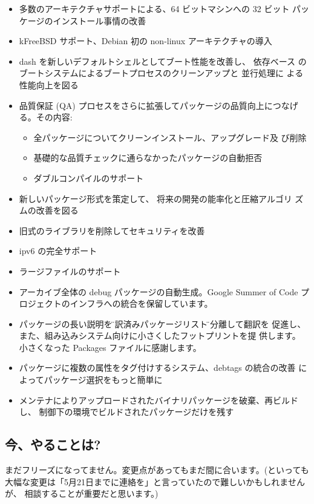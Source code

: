 \documentclass[mingoth,a4paper]{jsarticle}
\begin{document}
\begin{itemize}
 \item 多数のアーキテクチャサポートによる、64 ビットマシンへの 32 ビット
       パッケージのインストール事情の改善
 \item kFreeBSD サポート、Debian 初の non-linux アーキテクチャの導入
 \item dash を新しいデフォルトシェルとしてブート性能を改善し、 依存ベース
       のブートシステムによるブートプロセスのクリーンアップと 並行処理に
       よる性能向上を図る
 \item 品質保証 (QA) プロセスをさらに拡張してパッケージの品質向上につなげ
       る。その内容:
        \begin{itemize}
         \item 全パッケージについてクリーンインストール、アップグレード及
               び削除
         \item 基礎的な品質チェックに通らなかったパッケージの自動拒否
         \item ダブルコンパイルのサポート
        \end{itemize}
 \item 新しいパッケージ形式を策定して、 将来の開発の能率化と圧縮アルゴリ
       ズムの改善を図る
 \item 旧式のライブラリを削除してセキュリティを改善
 \item ipv6 の完全サポート
 \item ラージファイルのサポート
 \item アーカイブ全体の debug パッケージの自動生成。Google Summer of
       Code プロジェクトのインフラへの統合を保留しています。
 \item パッケージの長い説明を\"翻訳済みパッケージリスト\"に分離して翻訳を
       促進し、 また、組み込みシステム向けに小さくしたフットプリントを提
       供します。 小さくなった Packages ファイルに感謝します。
 \item パッケージに複数の属性をタグ付けするシステム、debtags の統合の改善
       によってパッケージ選択をもっと簡単に
 \item メンテナによりアップロードされたバイナリパッケージを破棄、再ビルド
       し、 制御下の環境でビルドされたパッケージだけを残す
\end{itemize}

\subsection{今、やることは?}

まだフリーズになってません。変更点があってもまだ間に合います。(といっても
大幅な変更は「5月21日までに連絡を」と言っていたので難しいかもしれませんが、
相談することが重要だと思います。)
\end{document}
